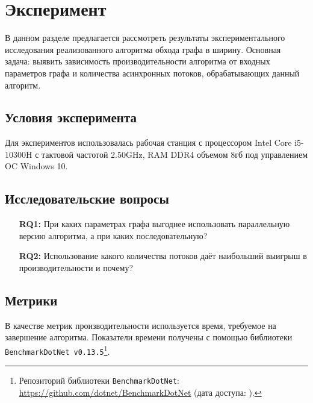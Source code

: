 
\section{Эксперимент}

В данном разделе предлагается рассмотреть результаты экспериментального исследования реализованного алгоритма обхода графа в ширину. Основная задача: выявить зависимость производительности алгоритма от входных параметров графа и количества асинхронных потоков, обрабатывающих данный алгоритм.

\subsection{Условия эксперимента}
Для экспериментов использовалась рабочая станция с процессором Intel Core i5-10300H с тактовой частотой 2.50GHz, RAM DDR4 объемом 8гб под управлением OC Windows 10.

\subsection{Исследовательские вопросы }

\begin{itemize}
\item[\textbf{RQ1:}] При каких параметрах графа выгоднее использовать параллельную версию алгоритма, а при каких последовательную?
\item[\textbf{RQ2:}] Использование какого количества потоков даёт наибольший выигрыш в производительности и почему?
\end{itemize}


\subsection{Метрики}
В качестве метрик производительности используется время, требуемое на завершение алгоритма. Показатели времени получены с помощью библиотеки \texttt{BenchmarkDotNet v0.13.5}\footnote{Репозиторий библиотеки \texttt{BenchmarkDotNet}: \url{https://github.com/dotnet/BenchmarkDotNet} (дата доступа:   ).}.

